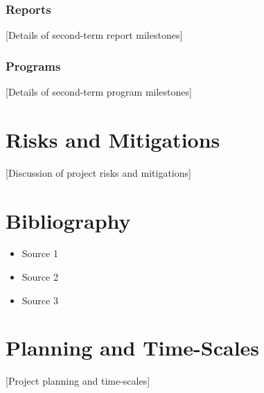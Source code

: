 \documentclass[a4paper,12pt]{article}
\begin{document}
\subsubsection{Reports}
[Details of second-term report milestones]

\subsubsection{Programs}
[Details of second-term program milestones]

\section{Risks and Mitigations}
[Discussion of project risks and mitigations]

\section{Bibliography}
\begin{itemize}
  \item Source 1
  \item Source 2
  \item Source 3
\end{itemize}

\section{Planning and Time-Scales}
[Project planning and time-scales]
\end{document}
